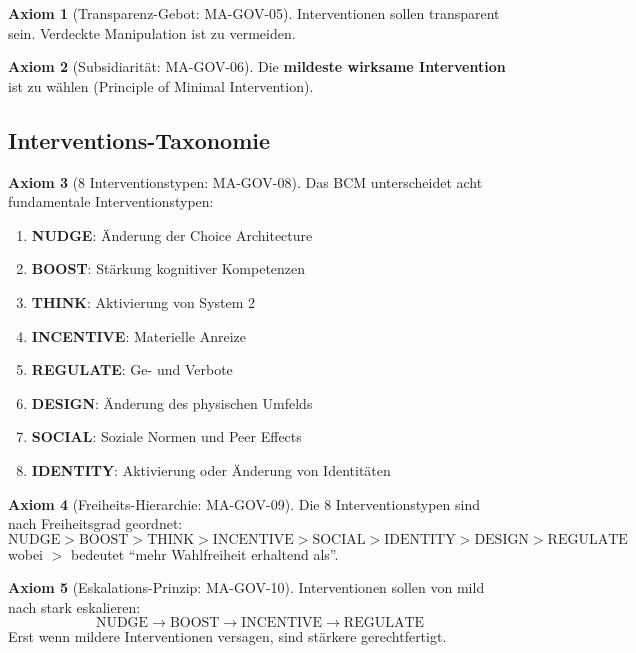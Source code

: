 \documentclass[11pt,a4paper]{article}
\theoremstyle{definition}
\newtheorem{axiom}{Axiom}[section]
\theoremstyle{plain}
\newcommand{\BCM}{\textsc{BCM}}
\begin{document}
\begin{axiom}[Transparenz-Gebot: MA-GOV-05]
Interventionen sollen transparent sein. Verdeckte Manipulation ist zu vermeiden.
\end{axiom}

\begin{axiom}[Subsidiarität: MA-GOV-06]
Die \textbf{mildeste wirksame Intervention} ist zu wählen (Principle of Minimal Intervention).
\end{axiom}

\subsection{Interventions-Taxonomie}

\begin{axiom}[8 Interventionstypen: MA-GOV-08]
Das \BCM{} unterscheidet acht fundamentale Interventionstypen:
\begin{enumerate}
    \item \textbf{NUDGE}: Änderung der Choice Architecture
    \item \textbf{BOOST}: Stärkung kognitiver Kompetenzen
    \item \textbf{THINK}: Aktivierung von System 2
    \item \textbf{INCENTIVE}: Materielle Anreize
    \item \textbf{REGULATE}: Ge- und Verbote
    \item \textbf{DESIGN}: Änderung des physischen Umfelds
    \item \textbf{SOCIAL}: Soziale Normen und Peer Effects
    \item \textbf{IDENTITY}: Aktivierung oder Änderung von Identitäten
\end{enumerate}
\end{axiom}

\begin{axiom}[Freiheits-Hierarchie: MA-GOV-09]
Die 8 Interventionstypen sind nach Freiheitsgrad geordnet:
\begin{equation}
\text{NUDGE} > \text{BOOST} > \text{THINK} > \text{INCENTIVE} > \text{SOCIAL} > \text{IDENTITY} > \text{DESIGN} > \text{REGULATE}
\end{equation}
wobei $>$ bedeutet ``mehr Wahlfreiheit erhaltend als''.
\end{axiom}

\begin{axiom}[Eskalations-Prinzip: MA-GOV-10]
Interventionen sollen von mild nach stark eskalieren:
\begin{equation}
\text{NUDGE} \rightarrow \text{BOOST} \rightarrow \text{INCENTIVE} \rightarrow \text{REGULATE}
\end{equation}
Erst wenn mildere Interventionen versagen, sind stärkere gerechtfertigt.
\end{axiom}
\end{document}
